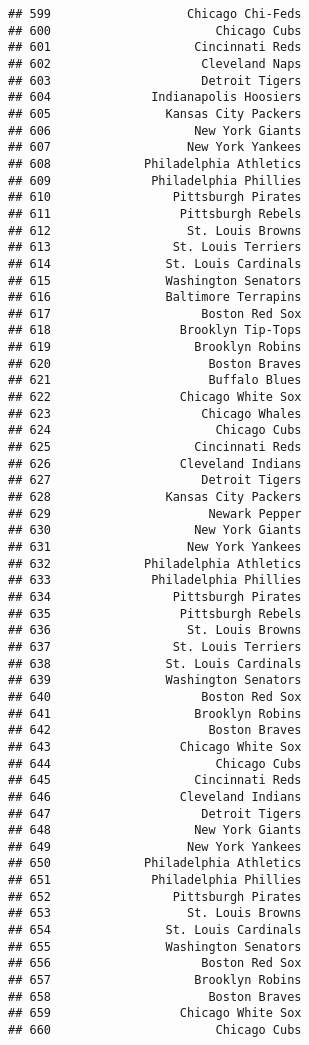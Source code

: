 \documentclass[]{article}
\begin{document}
\begin{verbatim}
## 599                   Chicago Chi-Feds
## 600                       Chicago Cubs
## 601                    Cincinnati Reds
## 602                     Cleveland Naps
## 603                     Detroit Tigers
## 604              Indianapolis Hoosiers
## 605                Kansas City Packers
## 606                    New York Giants
## 607                   New York Yankees
## 608             Philadelphia Athletics
## 609              Philadelphia Phillies
## 610                 Pittsburgh Pirates
## 611                  Pittsburgh Rebels
## 612                   St. Louis Browns
## 613                 St. Louis Terriers
## 614                St. Louis Cardinals
## 615                Washington Senators
## 616                Baltimore Terrapins
## 617                     Boston Red Sox
## 618                  Brooklyn Tip-Tops
## 619                    Brooklyn Robins
## 620                      Boston Braves
## 621                      Buffalo Blues
## 622                  Chicago White Sox
## 623                     Chicago Whales
## 624                       Chicago Cubs
## 625                    Cincinnati Reds
## 626                  Cleveland Indians
## 627                     Detroit Tigers
## 628                Kansas City Packers
## 629                      Newark Pepper
## 630                    New York Giants
## 631                   New York Yankees
## 632             Philadelphia Athletics
## 633              Philadelphia Phillies
## 634                 Pittsburgh Pirates
## 635                  Pittsburgh Rebels
## 636                   St. Louis Browns
## 637                 St. Louis Terriers
## 638                St. Louis Cardinals
## 639                Washington Senators
## 640                     Boston Red Sox
## 641                    Brooklyn Robins
## 642                      Boston Braves
## 643                  Chicago White Sox
## 644                       Chicago Cubs
## 645                    Cincinnati Reds
## 646                  Cleveland Indians
## 647                     Detroit Tigers
## 648                    New York Giants
## 649                   New York Yankees
## 650             Philadelphia Athletics
## 651              Philadelphia Phillies
## 652                 Pittsburgh Pirates
## 653                   St. Louis Browns
## 654                St. Louis Cardinals
## 655                Washington Senators
## 656                     Boston Red Sox
## 657                    Brooklyn Robins
## 658                      Boston Braves
## 659                  Chicago White Sox
## 660                       Chicago Cubs

\end{verbatim}
\end{document}
